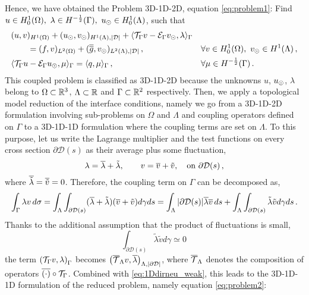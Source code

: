 Hence, we have obtained the Problem 3D-1D-2D, equation 
\eqref{eq:problem1}:
Find $u \in H^1_0(\Omega), \ \lambda \in H^{-\frac 1 2}(\Gamma ),\ u_{\odot} \in H^1_0(\Lambda)$, such that
\begin{subequations}
\begin{align*}
&(u,v)_{H^1(\Omega)} + (u_{\odot},v_{\odot})_{H^1(\Lambda),|\mathcal{D}|} 
+ \langle {\mathcal{T}_\Gamma} v  - \mathcal{E}_\Gamma v_{\odot}, \lambda \rangle_\Gamma &&
\\
\nonumber
&\qquad= (f,v)_{L^2(\Omega)} +  (\overline{\overline{g}},v_{\odot})_{L^2(\Lambda),|\mathcal{D}|}\,,
\quad &&\forall v \in H^1_0(\Omega), \ v_{\odot} \in H^1(\Lambda)\,,
\\
& \langle {\mathcal{T}_\Gamma} u - \mathcal{E}_\Gamma u_{\odot} , \mu \rangle_\Gamma 
= \langle q, \mu \rangle_\Gamma\,,
\quad && \forall \mu \in H^{-\frac 1 2}(\Gamma)\,.
\end{align*}
\end{subequations}
This coupled problem is classified as 3D-1D-2D because the unknowns $u$, $u_{\odot}$, $\lambda$ belong to $\Omega \subset \mathbb{R}^3$, $\Lambda \subset \mathbb{R}$ and $\Gamma \subset \mathbb{R}^2$ respectively.
Then, we apply a topological model reduction of the interface conditions, namely we go from a 3D-1D-2D formulation
involving sub-problems on $\Omega$ and $\Lambda$ and coupling operators defined on $\Gamma$
to a 3D-1D-1D formulation where the coupling terms are set on $\Lambda$. 
To this purpose, let us write the Lagrange multiplier and the test functions on every cross section $\partial\mathcal{D}(s)$ as their average plus some fluctuation,
\begin{equation*}
\lambda=\overline{\lambda}+\tilde{\lambda}, \qquad v=\overline{v}+\tilde{v},
\quad \text{on} \ \partial\mathcal{D}(s)\,,
\end{equation*}
where $\overline{\tilde{\lambda}}=\overline{\tilde{v}}=0$. 
Therefore, the coupling term on $\Gamma$ can be decomposed as,
\begin{equation*}
\int_{\Gamma}\lambda v\, d\sigma
=\int _{\Lambda}  \int_{\partial\mathcal{D}(s)} (\overline{\lambda}+\tilde{\lambda})(\overline{v}+\tilde{v})d\gamma ds
= \int_{\Lambda}|\partial\mathcal{D}(s)| \overline{\lambda}\overline{v}\,ds+\int_{\Lambda}  \int_{\partial\mathcal{D}(s)} \tilde{\lambda}\tilde{v}d\gamma ds\,.
\end{equation*}
Thanks to the additional assumption that the product of fluctuations is small,
\begin{equation*}
\int_{\partial\mathcal{D}(s)} \tilde{\lambda}\tilde{v} d\gamma \simeq 0\,
\end{equation*}
the term $\left({\mathcal{T}_\Gamma} v, \lambda \right)_{\Gamma}$ becomes $\left( {\overline{\mathcal{T}}_\Lambda} v, \overline{\lambda} \right)_{\Lambda, |\partial\mathcal{D}|}$, where ${\overline{\mathcal{T}}_\Lambda}$ denotes the composition of operators $\overline{(\cdot)}\circ {\mathcal{T}_\Gamma}$.  Combined with \eqref{eq:1Ddirneu_weak}, this leads to the 3D-1D-1D formulation of the reduced problem, namely equation \eqref{eq:problem2}:
